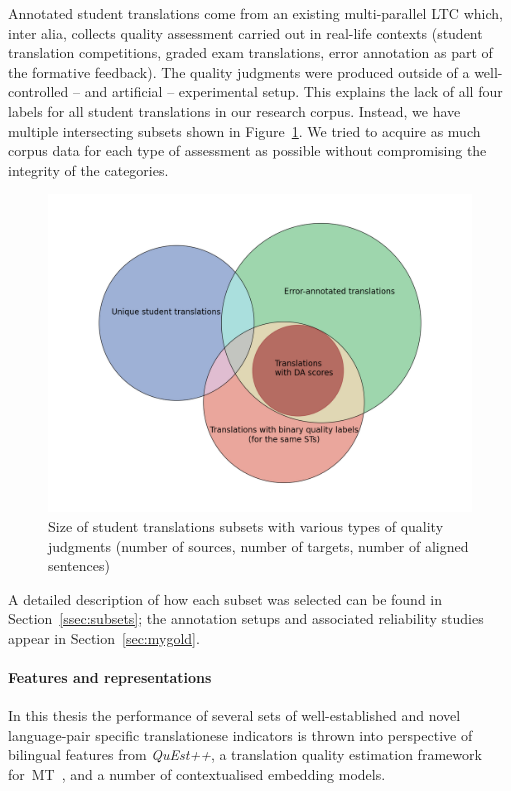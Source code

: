 Annotated student translations come from an existing multi-parallel \gls{LTC} which, inter alia, collects quality assessment carried out in real-life contexts (student translation competitions, graded exam translations, error annotation as part of the formative feedback). The quality judgments were produced outside of a well-controlled -- and artificial -- experimental setup.
This explains the lack of all four labels for all student translations in our research corpus. Instead, we have multiple intersecting subsets shown in Figure~\ref{fig:subsets}. We tried to acquire as much corpus data for each type of assessment as possible without compromising the integrity of the categories.
\label{pg:subsets}
\begin{figure}[h ] %
	\centering
	\includegraphics[scale=0.5]{figures/subsets}
	\caption{Size of student translations subsets with various types of quality judgments (number of sources, number of targets, number of aligned sentences)}
	\label{fig:subsets}
\end{figure}


A detailed description of how each subset was selected can be found in Section~\ref{ssec:subsets}; the annotation setups and associated reliability studies appear in Section~\ref{sec:mygold}. 

\paragraph{Features and representations} In this thesis the performance of several sets of well-established and novel language-pair specific translationese indicators is thrown into perspective of bilingual features from \textit{QuEst++}, a translation quality estimation framework for~\gls*{MT}~\cite{Specia2015quest}, and a number of contextualised embedding models.

